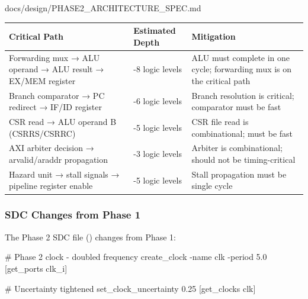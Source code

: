 \begin{relocated}{docs/design/PHASE2_ARCHITECTURE_SPEC.md}
{{
\begin{longtable}[]{@{}
  >{\raggedright\arraybackslash}p{}
  >{\raggedright\arraybackslash}p{}
  >{\raggedright\arraybackslash}p{}@{}}
\toprule\noalign{}
\begin{minipage}[b]{\linewidth}\raggedright
Critical Path
\end{minipage} & \begin{minipage}[b]{\linewidth}\raggedright
Estimated Depth
\end{minipage} & \begin{minipage}[b]{\linewidth}\raggedright
Mitigation
\end{minipage} \\
\midrule\noalign{}
\endhead
\bottomrule\noalign{}
\endlastfoot
Forwarding mux → ALU operand → ALU result → EX/MEM register & 5-8 logic
levels & ALU must complete in one cycle; forwarding mux is on the
critical path \\
Branch comparator → PC redirect → IF/ID register & 4-6 logic levels &
Branch resolution is critical; comparator must be fast \\
CSR read → ALU operand B (CSRRS/\allowbreak{}CSRRC) & 3-5 logic levels &
CSR file read is combinational; must be fast \\
AXI arbiter decision → arvalid/\allowbreak{}araddr propagation & 2-3
logic levels & Arbiter is combinational; should not be
timing-critical \\
Hazard unit → stall signals → pipeline register enable & 3-5 logic
levels & Stall propagation must be single cycle \\
\end{longtable}
}

}

\subsubsection{SDC Changes from Phase 1}\label{ds:ch:phase2-architecture:85-sdc-changes-from-phase-1}

The Phase 2 SDC file () changes from
Phase 1:

\begin{textblock}
# Phase 2 clock - doubled frequency
create_clock -name clk -period 5.0 [get_ports clk_i]

# Uncertainty tightened
set_clock_uncertainty 0.25 [get_clocks clk]


\end{textblock}
\end{relocated}
